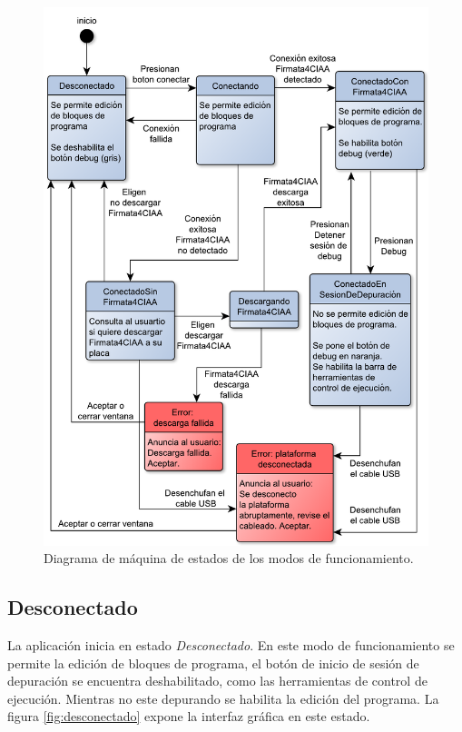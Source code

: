 \begin{figure}[!htbp]
	\begin{center}  %
		\includegraphics*[width=15cm]{./Figures/diagrama-estados.pdf}
		\par\caption{Diagrama de máquina de estados de los modos de funcionamiento.}\label{fig:diagrama-estados}
	\end{center}
\end{figure}


\subsection{Desconectado}
\label{subsec:No Conectado}

La aplicación inicia en estado \emph{Desconectado}. En este modo de funcionamiento se permite la edición de bloques de programa, el botón de inicio de sesión de depuración se encuentra deshabilitado, como las herramientas de control de ejecución. Mientras no este depurando se habilita la edición del programa. La figura \ref{fig:desconectado} expone la interfaz gráfica en este estado.


